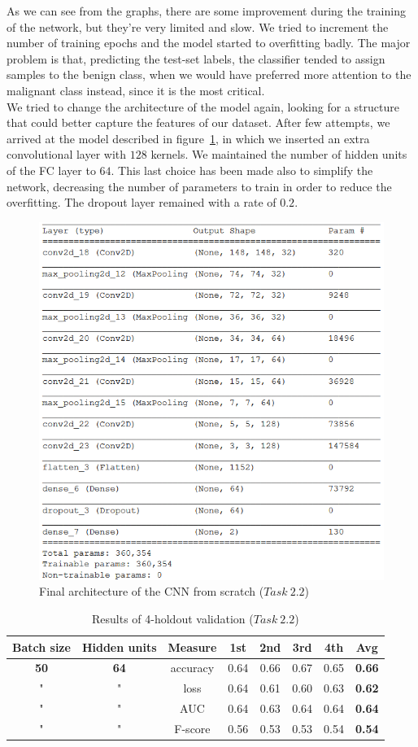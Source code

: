 \documentclass[11pt,a4paper,oneside]{article}
\begin{document}
As we can see from the graphs, there are some improvement during the training of the network, but they're very limited and slow. We tried to increment the number of training epochs and the model started to overfitting badly. The major problem is that, predicting the test-set labels, the classifier tended to assign samples to the benign class, when we would have preferred more attention to the malignant class instead, since it is the most critical.\\

We tried to change the architecture of the model again, looking for a structure that could better capture the features of our dataset. After few attempts, we arrived at the model described in figure~\ref{fig:model_2.2_1}, in which we inserted an extra convolutional layer with $128$ kernels. We maintained the number of hidden units of the FC layer to $64$. This last choice has been made also to simplify the network, decreasing the number of parameters to train in order to reduce the overfitting. The dropout layer remained with a rate of $0.2$.

\begin{figure}[h]
\centering
\includegraphics[width=.5\textwidth]{images/2.2/1_model}
\caption{Final architecture of the CNN from scratch ($Task\ 2.2$)}
\label{fig:model_2.2_1}
\end{figure}

\clearpage

\begin{table}[h]
\centering
\begin{tabular}{|cccccccc|}
\hline
Batch size & Hidden units & Measure & 1st & 2nd & 3rd & 4th & \textbf{Avg} \\
\hline
\textbf{50} & \textbf{64} & accuracy & 0.64 & 0.66 & 0.67 & 0.65 & \textbf{0.66} \\
" & " & loss & 0.64 & 0.61 & 0.60 & 0.63 & \textbf{0.62} \\
" & " & AUC & 0.64 & 0.63 & 0.64 & 0.64 & \textbf{0.64} \\
" & " & F-score & 0.56 & 0.53 & 0.53 & 0.54 & \textbf{0.54} \\
\hline
\end{tabular}
\caption{Results of 4-holdout validation ($Task\ 2.2$)}
\label{tab:task2.2}
\end{table}
\end{document}
